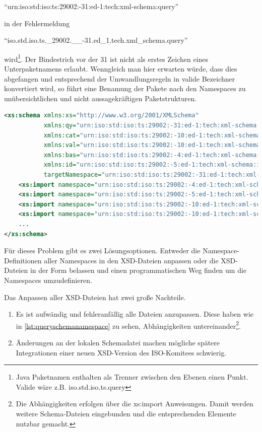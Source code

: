 \enquote{urn:iso:std:iso:ts:29002:-31:ed-1:tech:xml-schema:query} 

in der Fehlermeldung 

\enquote{iso.std.iso.ts.\_29002.\_\_-31.ed\_1.tech.xml\_schema.query} 

wird\footnote{Java Paketnamen enthalten als Trenner zwischen den Ebenen einen Punkt. Valide wäre z.B. iso.std.iso.ts.query}.
Der Bindestrich vor der 31 ist nicht als erstes Zeichen eines Unterpaketnamens erlaubt. Wenngleich man hier erwarten würde, dass dies abgefangen und entsprechend der Umwandlungsregeln in valide Bezeichner konvertiert wird, so führt eine Benamung der Pakete nach den \Glspl{Namespace} zu unübersichtlichen und nicht aussagekräftigen Paketstrukturen. 

\begin{lstlisting}[caption=query.xsd Namespace Definitionen, language=XML, label=lst:queryschemanamespace]
<xs:schema xmlns:xs="http://www.w3.org/2001/XMLSchema"
           xmlns:qy="urn:iso:std:iso:ts:29002:-31:ed-1:tech:xml-schema:query"
           xmlns:cat="urn:iso:std:iso:ts:29002:-10:ed-1:tech:xml-schema:catalogue"
           xmlns:val="urn:iso:std:iso:ts:29002:-10:ed-1:tech:xml-schema:value"
           xmlns:bas="urn:iso:std:iso:ts:29002:-4:ed-1:tech:xml-schema:basic"
           xmlns:id="urn:iso:std:iso:ts:29002:-5:ed-1:tech:xml-schema:identifier"
           targetNamespace="urn:iso:std:iso:ts:29002:-31:ed-1:tech:xml-schema:query" elementFormDefault="qualified">
    <xs:import namespace="urn:iso:std:iso:ts:29002:-4:ed-1:tech:xml-schema:basic" schemaLocation="basic.xsd"/>
    <xs:import namespace="urn:iso:std:iso:ts:29002:-5:ed-1:tech:xml-schema:identifier" schemaLocation="identifier.xsd"/>
    <xs:import namespace="urn:iso:std:iso:ts:29002:-10:ed-1:tech:xml-schema:catalogue" schemaLocation="catalogue.xsd"/>
    <xs:import namespace="urn:iso:std:iso:ts:29002:-10:ed-1:tech:xml-schema:value" schemaLocation="value.xsd"/>
    ...
</xs:schema>    
\end{lstlisting}

Für dieses Problem gibt es zwei Lösungsoptionen. Entweder die \gls{Namespace}-Definitionen aller \Glspl{Namespace} in den XSD-Dateien anpassen oder die XSD-Dateien in der Form belassen und einen programmatischen Weg finden um die \Glspl{Namespace} umzudefinieren. 

Das Anpassen aller XSD-Dateien hat zwei große Nachteile.
\begin{enumerate}
\item Es ist aufwändig und fehleranfällig alle Dateien anzupassen. Diese haben wie in \autoref{lst:queryschemanamespace} zu sehen, Abhängigkeiten untereinander\footnote{Die Abhängigkeiten erfolgen über die xs:import Anweisungen. Damit werden weitere Schema-Dateien eingebunden und die entsprechenden Elemente nutzbar gemacht.}.
\item Änderungen an der lokalen Schemadatei machen mögliche spätere Integrationen einer neuen XSD-Version des ISO-Komitees schwierig.
\end{enumerate}

